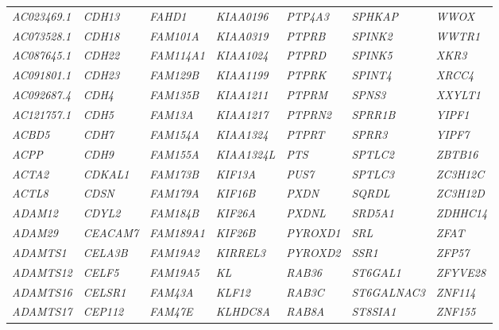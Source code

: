 \begin{refsection}
\begin{otherlanguage}{english}
\begin{scriptsize}
\begin{longtable}{lllllll}
\textit{AC023469.1} & \textit{CDH13} & \textit{FAHD1} & \textit{KIAA0196} & \textit{PTP4A3} & \textit{SPHKAP} & \textit{WWOX} \\
\textit{AC073528.1} & \textit{CDH18} & \textit{FAM101A} & \textit{KIAA0319} & \textit{PTPRB} & \textit{SPINK2} & \textit{WWTR1} \\
\textit{AC087645.1} & \textit{CDH22} & \textit{FAM114A1} & \textit{KIAA1024} & \textit{PTPRD} & \textit{SPINK5} & \textit{XKR3} \\
\textit{AC091801.1} & \textit{CDH23} & \textit{FAM129B} & \textit{KIAA1199} & \textit{PTPRK} & \textit{SPINT4} & \textit{XRCC4} \\
\textit{AC092687.4} & \textit{CDH4} & \textit{FAM135B} & \textit{KIAA1211} & \textit{PTPRM} & \textit{SPNS3} & \textit{XXYLT1} \\
\textit{AC121757.1} & \textit{CDH5} & \textit{FAM13A} & \textit{KIAA1217} & \textit{PTPRN2} & \textit{SPRR1B} & \textit{YIPF1} \\
\textit{ACBD5} & \textit{CDH7} & \textit{FAM154A} & \textit{KIAA1324} & \textit{PTPRT} & \textit{SPRR3} & \textit{YIPF7} \\
\textit{ACPP} & \textit{CDH9} & \textit{FAM155A} & \textit{KIAA1324L} & \textit{PTS} & \textit{SPTLC2} & \textit{ZBTB16} \\
\textit{ACTA2} & \textit{CDKAL1} & \textit{FAM173B} & \textit{KIF13A} & \textit{PUS7} & \textit{SPTLC3} & \textit{ZC3H12C} \\
\textit{ACTL8} & \textit{CDSN} & \textit{FAM179A} & \textit{KIF16B} & \textit{PXDN} & \textit{SQRDL} & \textit{ZC3H12D} \\
\textit{ADAM12} & \textit{CDYL2} & \textit{FAM184B} & \textit{KIF26A} & \textit{PXDNL} & \textit{SRD5A1} & \textit{ZDHHC14} \\
\textit{ADAM29} & \textit{CEACAM7} & \textit{FAM189A1} & \textit{KIF26B} & \textit{PYROXD1} & \textit{SRL} & \textit{ZFAT} \\
\textit{ADAMTS1} & \textit{CELA3B} & \textit{FAM19A2} & \textit{KIRREL3} & \textit{PYROXD2} & \textit{SSR1} & \textit{ZFP57} \\
\textit{ADAMTS12} & \textit{CELF5} & \textit{FAM19A5} & \textit{KL} & \textit{RAB36} & \textit{ST6GAL1} & \textit{ZFYVE28} \\
\textit{ADAMTS16} & \textit{CELSR1} & \textit{FAM43A} & \textit{KLF12} & \textit{RAB3C} & \textit{ST6GALNAC3} & \textit{ZNF114} \\
\textit{ADAMTS17} & \textit{CEP112} & \textit{FAM47E} & \textit{KLHDC8A} & \textit{RAB8A} & \textit{ST8SIA1} & \textit{ZNF155} \\

\end{longtable}
\end{scriptsize}
\end{otherlanguage}
\end{refsection}
